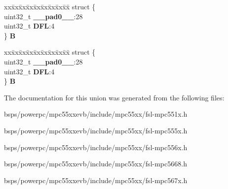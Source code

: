 \begin{DoxyCompactItemize}
\begin{tabbing}
\end{tabbing}\item 
\mbox{\label{unionSIU__tag_1_1SIU__IDFR__tag_ac3497713823c3be1da0b5a8c7fbca462}} 
\begin{tabbing}
xx\=xx\=xx\=xx\=xx\=xx\=xx\=xx\=xx\=\kill
struct \{\\
\>uint32\_t {\bfseries \_\_pad0\_\_}:28\\
\>uint32\_t {\bfseries DFL}:4\\
\} {\bfseries B}\\

\end{tabbing}\item 
\mbox{\label{unionSIU__tag_1_1SIU__IDFR__tag_a04df1f5064a2f7075993980b58ab4a90}} 
\begin{tabbing}
xx\=xx\=xx\=xx\=xx\=xx\=xx\=xx\=xx\=\kill
struct \{\\
\>uint32\_t {\bfseries \_\_pad0\_\_}:28\\
\>uint32\_t {\bfseries DFL}:4\\
\} {\bfseries B}\\

\end{tabbing}\end{DoxyCompactItemize}


The documentation for this union was generated from the following files\+:\begin{DoxyCompactItemize}
\item 
bsps/powerpc/mpc55xxevb/include/mpc55xx/fsl-\/mpc551x.\+h\item 
bsps/powerpc/mpc55xxevb/include/mpc55xx/fsl-\/mpc555x.\+h\item 
bsps/powerpc/mpc55xxevb/include/mpc55xx/fsl-\/mpc556x.\+h\item 
bsps/powerpc/mpc55xxevb/include/mpc55xx/fsl-\/mpc5668.\+h\item 
bsps/powerpc/mpc55xxevb/include/mpc55xx/fsl-\/mpc567x.\+h\end{DoxyCompactItemize}
